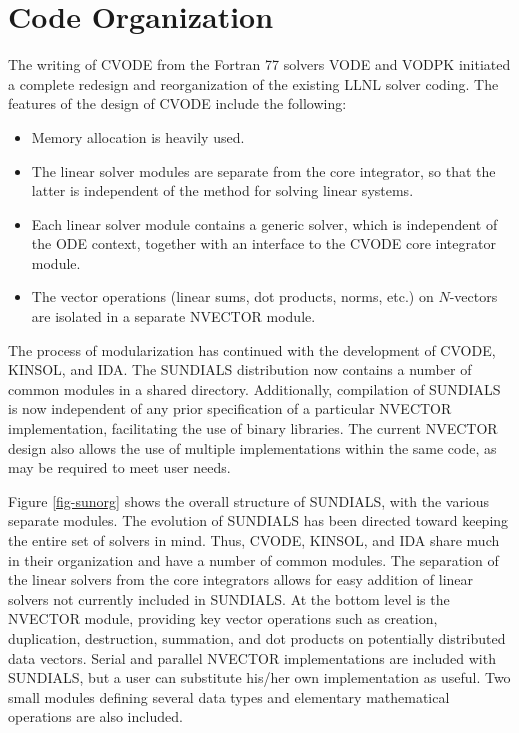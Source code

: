 \section{Code Organization}
\label{s:organization}

The writing of CVODE from the Fortran 77 solvers VODE and VODPK
initiated a complete redesign and reorganization of the existing
LLNL solver coding. The features of the design of CVODE include
the following:
\begin{itemize}
\item Memory allocation is heavily used.
\item The linear solver modules are separate from the core integrator,
so that the latter is independent of the method for solving linear
systems.
\item Each linear solver module contains  a generic solver, which is
independent of the ODE context, together with an interface to the CVODE core
integrator module.
\item The vector operations  (linear sums, dot products, norms, etc.) on
$N$-vectors are isolated in a separate NVECTOR module.
\end{itemize}

The process of modularization has continued with the development of CVODE,
KINSOL, and IDA. The SUNDIALS distribution now contains a number of common
modules in a shared directory. Additionally, compilation of SUNDIALS is now
independent of any prior specification of a particular NVECTOR
implementation, facilitating the use of binary libraries. The current
NVECTOR design also allows the use of multiple implementations within the
same code, as may be required to meet user needs.

Figure \ref{fig-sunorg} shows the overall structure of SUNDIALS, with the
various separate modules. The evolution of SUNDIALS has been directed toward
keeping the entire set of solvers in mind. Thus, CVODE, KINSOL, and IDA share
much in their organization and have a number of common modules.  The
separation of the linear solvers from the core integrators allows for easy
addition of linear solvers not currently included in SUNDIALS. At the bottom
level is the NVECTOR module, providing key vector operations such as creation,
duplication, destruction, summation, and dot products on potentially
distributed data vectors. Serial and parallel NVECTOR implementations are
included with SUNDIALS, but a user can substitute his/her own implementation
as useful. Two small modules defining several data types and elementary
mathematical operations are also included.

